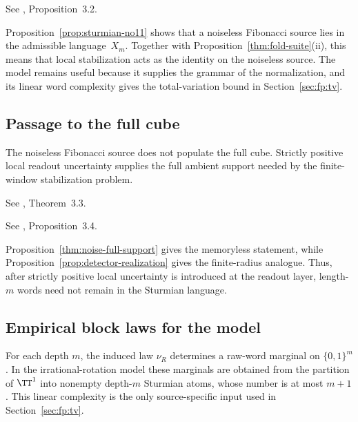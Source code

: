 \begin{proposition}\label{prop:sturmian-no11}
See \cite{MaZhang2026Nonlinearity}, Proposition~3.2.
\end{proposition}

\begin{remark}
Proposition~\ref{prop:sturmian-no11} shows that a noiseless Fibonacci source lies in the admissible language~$X_m$. Together with Proposition~\ref{thm:fold-suite}(ii), this means that local stabilization acts as the identity on the noiseless source. The model remains useful because it supplies the grammar of the normalization, and its linear word complexity gives the total-variation bound in Section~\ref{sec:fp:tv}.
\end{remark}

\subsection{Passage to the full cube}\label{sec:readout:noise}

The noiseless Fibonacci source does not populate the full cube. Strictly positive local readout uncertainty supplies the full ambient support needed by the finite-window stabilization problem.

\begin{proposition}\label{thm:noise-full-support}
See \cite{MaZhang2026Nonlinearity}, Theorem~3.3.
\end{proposition}

\begin{proposition}\label{prop:detector-realization}
See \cite{MaZhang2026Nonlinearity}, Proposition~3.4.
\end{proposition}

\begin{remark}
Proposition~\ref{thm:noise-full-support} gives the memoryless statement, while Proposition~\ref{prop:detector-realization} gives the finite-radius analogue. Thus, after strictly positive local uncertainty is introduced at the readout layer, length-$m$ words need not remain in the Sturmian language.
\end{remark}

\subsection{Empirical block laws for the model}\label{sec:readout:empirical}

For each depth $m$, the induced law $\nu_R$ determines a raw-word marginal on $\{0,1\}^m$. In the irrational-rotation model these marginals are obtained from the partition of $\TT^1$ into nonempty depth-$m$ Sturmian atoms, whose number is at most $m+1$. This linear complexity is the only source-specific input used in Section~\ref{sec:fp:tv}.
